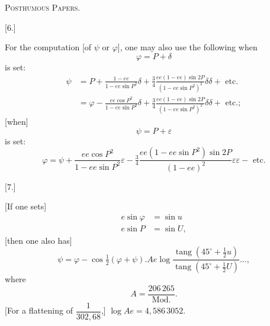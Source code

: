 \begingroup
\clearpage
{}\hfill\textsc{Posthumous Papers.}\hfill\mbox{}\par\bigskip
\begin{center}[6.]\end{center}
For the computation [of $\psi$ or $\varphi$], one may also use the following when
\[
\varphi=P+\delta
\]
is set:
\[
\begin{aligned}
\psi&=P+\frac{1-ee}{1-ee\sin P^2}\delta+\tfrac34\frac{ee(1-ee)\sin2P}{(1-ee\sin P^2)^2}\delta\delta+\text{ etc.}\\[5pt]
&=\varphi-\frac{ee\cos P^2}{1-ee\sin P^2}\delta+\tfrac34\frac{ee(1-ee)\sin2P}{(1-ee\sin P^2)^2}\delta\delta+\text{ etc.};
\end{aligned}
\]
[when]
\[
\psi=P+\varepsilon
\]
is set:
\[
\varphi=\psi+\frac{ee\cos P^2}{1-ee\sin P^2}\varepsilon-\tfrac34\frac{ee(1-ee\sin P^2)\sin2P}{(1-ee)^2}\varepsilon\varepsilon-\text{ etc.}
\]
\bigskip
\begin{center}[7.]\end{center}
[If one sets]
\[
\begin{aligned}
e\sin\varphi&=\sin u\\
e\sin P&=\sin U,
\end{aligned}
\]
[then one also has]
\[
\psi=\varphi-\cos\tfrac12(\varphi+\psi).Ae\log\frac{\operatorname{tang}(45^\circ+\frac12u)}{\operatorname{tang}(45^\circ+\frac12U)}\ldots,
\]
where
\[
A=\frac{206\,265}{\mathrm{Mod.}}.
\]
[For a flattening of $\dfrac1{302{,}68}$,] $\log Ae=4{,}586\,3052$.

